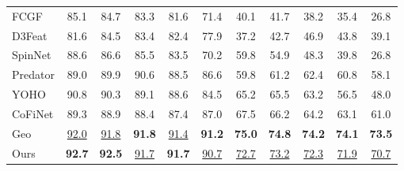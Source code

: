 \begin{table}[htp]
\begin{tabular}{lcccccccccc}
    \multicolumn{1}{l}{FCGF}
    & 85.1  & 84.7  & 83.3  & 81.6  & \multicolumn{1}{c}{71.4}
    & 40.1  & 41.7  & 38.2  & 35.4  & 26.8
    \\
    \multicolumn{1}{l}{D3Feat}
    & 81.6  & 84.5  & 83.4  & 82.4  & \multicolumn{1}{c}{77.9}
    & 37.2  & 42.7  & 46.9  & 43.8  & 39.1
    \\
    \multicolumn{1}{l}{SpinNet}
    & 88.6  & 86.6  & 85.5  & 83.5  & \multicolumn{1}{c}{70.2}
    & 59.8  & 54.9  & 48.3  & 39.8  & 26.8
    \\
    \multicolumn{1}{l}{Predator}
    & 89.0  & 89.9  & 90.6  & 88.5  & \multicolumn{1}{c}{86.6}
    & 59.8  & 61.2  & 62.4  & 60.8  & 58.1
    \\
    \multicolumn{1}{l}{YOHO}
    & 90.8  & 90.3  & 89.1  & 88.6  & \multicolumn{1}{c}{84.5}
    & 65.2  & 65.5  & 63.2  & 56.5  & 48.0
    \\
    \multicolumn{1}{l}{CoFiNet}
    & 89.3  & 88.9  & 88.4  & 87.4  & \multicolumn{1}{c}{87.0}
    & 67.5  & 66.2  & 64.2  & 63.1  & 61.0
    \\
    \multicolumn{1}{l}{Geo}
    & \ul{92.0}     & \ul{91.8}     & \textbf{91.8}  & \ul{91.4}     & \multicolumn{1}{c}{\textbf{91.2}} 
    & \textbf{75.0} & \textbf{74.8} & \textbf{74.2}  & \textbf{74.1} & \textbf{73.5}
    \\
    \multicolumn{1}{l}{Ours}
    & \textbf{92.7}  & \textbf{92.5}  & \ul{91.7}  & \textbf{91.7} & \multicolumn{1}{c}{\ul{90.7}}
    & \ul{72.7}      & \ul{73.2}      & \ul{72.3}   & \ul{71.9}     & \ul{70.7}
    \\ 
    \bottomrule[1.5pt]
    \end{tabular}
\end{table}